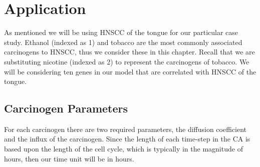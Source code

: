 \documentclass[\main/thesis.tex]{subfiles}
\begin{document}
\section{Application}
As mentioned we will be using HNSCC of the tongue for our particular case study. Ethanol (indexed as 1) and tobacco are the most commonly associated carcinogens to HNSCC, thus we consider these in this chapter. Recall that we are substituting nicotine (indexed as 2) to represent the carcinogens of tobacco. We will be considering ten genes in our model that are correlated with HNSCC of the tongue.

\subsection{Carcinogen Parameters}
For each carcinogen there are two required parameters, the diffusion coefficient and the influx of the carcinogen. Since the length of each time-step in the CA is based upon the length of the cell cycle, which is typically in the magnitude of hours, then our time unit will be in hours. 
\end{document}
